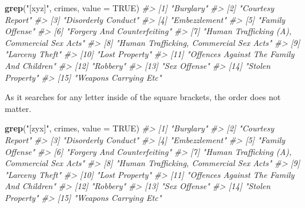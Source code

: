 \documentclass[
  12pt,
]{book}
\newenvironment{Shaded}{\begin{snugshade}}{\end{snugshade}}
\newcommand{\CommentTok}[1]{\textcolor[rgb]{0.37,0.37,0.37}{\textit{#1}}}
\newcommand{\DataTypeTok}[1]{\textcolor[rgb]{0.27,0.27,0.27}{#1}}
\newcommand{\KeywordTok}[1]{\textcolor[rgb]{0.27,0.27,0.27}{\textbf{#1}}}
\newcommand{\NormalTok}[1]{#1}
\newcommand{\OtherTok}[1]{\textcolor[rgb]{0.37,0.37,0.37}{#1}}
\newcommand{\StringTok}[1]{\textcolor[rgb]{0.5,0.5,0.5}{#1}}
\begin{document}
\begin{Shaded}
\begin{Highlighting}[]
\KeywordTok{grep}\NormalTok{(}\StringTok{"[xyz]"}\NormalTok{, crimes, }\DataTypeTok{value =} \OtherTok{TRUE}\NormalTok{)}
\CommentTok{\#>  [1] "Burglary"                                  }
\CommentTok{\#>  [2] "Courtesy Report"                           }
\CommentTok{\#>  [3] "Disorderly Conduct"                        }
\CommentTok{\#>  [4] "Embezzlement"                              }
\CommentTok{\#>  [5] "Family Offense"                            }
\CommentTok{\#>  [6] "Forgery And Counterfeiting"                }
\CommentTok{\#>  [7] "Human Trafficking (A), Commercial Sex Acts"}
\CommentTok{\#>  [8] "Human Trafficking, Commercial Sex Acts"    }
\CommentTok{\#>  [9] "Larceny Theft"                             }
\CommentTok{\#> [10] "Lost Property"                             }
\CommentTok{\#> [11] "Offences Against The Family And Children"  }
\CommentTok{\#> [12] "Robbery"                                   }
\CommentTok{\#> [13] "Sex Offense"                               }
\CommentTok{\#> [14] "Stolen Property"                           }
\CommentTok{\#> [15] "Weapons Carrying Etc"}
\end{Highlighting}
\end{Shaded}

As it searches for any letter inside of the square brackets, the order does not matter.

\begin{Shaded}
\begin{Highlighting}[]
\KeywordTok{grep}\NormalTok{(}\StringTok{"[zyx]"}\NormalTok{, crimes, }\DataTypeTok{value =} \OtherTok{TRUE}\NormalTok{)}
\CommentTok{\#>  [1] "Burglary"                                  }
\CommentTok{\#>  [2] "Courtesy Report"                           }
\CommentTok{\#>  [3] "Disorderly Conduct"                        }
\CommentTok{\#>  [4] "Embezzlement"                              }
\CommentTok{\#>  [5] "Family Offense"                            }
\CommentTok{\#>  [6] "Forgery And Counterfeiting"                }
\CommentTok{\#>  [7] "Human Trafficking (A), Commercial Sex Acts"}
\CommentTok{\#>  [8] "Human Trafficking, Commercial Sex Acts"    }
\CommentTok{\#>  [9] "Larceny Theft"                             }
\CommentTok{\#> [10] "Lost Property"                             }
\CommentTok{\#> [11] "Offences Against The Family And Children"  }
\CommentTok{\#> [12] "Robbery"                                   }
\CommentTok{\#> [13] "Sex Offense"                               }
\CommentTok{\#> [14] "Stolen Property"                           }
\CommentTok{\#> [15] "Weapons Carrying Etc"}
\end{Highlighting}
\end{Shaded}
\end{document}
